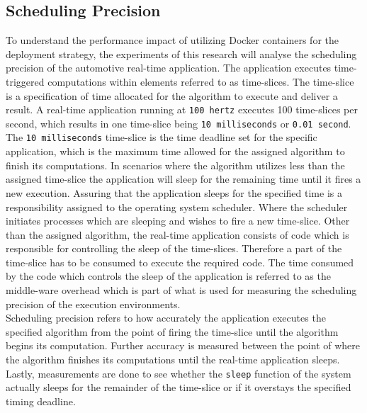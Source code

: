 \subsection{Scheduling Precision}
To understand the performance impact of utilizing Docker containers for the deployment strategy, the experiments of this research will analyse the scheduling precision of the automotive real-time application. The application executes time-triggered computations within elements referred to as time-slices. The time-slice is a specification of time allocated for the algorithm to execute and deliver a result. A real-time application running at \texttt{100 hertz} executes 100 time-slices per second, which results in one time-slice being \texttt{10 milliseconds} or \texttt{0.01 second}. The \texttt{10 milliseconds} time-slice is the time deadline set for the specific application, which is the maximum time allowed for the assigned algorithm to finish its computations. In scenarios where the algorithm utilizes less than the assigned time-slice the application will sleep for the remaining time until it fires a new execution. Assuring that the application sleeps for the specified time is a responsibility assigned to the operating system scheduler. Where the scheduler initiates processes which are sleeping and wishes to fire a new time-slice. Other than the assigned algorithm, the real-time application consists of code which is responsible for controlling the sleep of the time-slices. Therefore a part of the time-slice has to be consumed to execute the required code. The time consumed by the code which controls the sleep of the application is referred to as the middle-ware overhead which is part of what is used for measuring the scheduling precision of the execution environments.\\

Scheduling precision refers to how accurately the application executes the specified algorithm from the point of firing the time-slice until the algorithm begins its computation. Further accuracy is measured between the point of where the algorithm finishes its computations until the real-time application sleeps. Lastly, measurements are done to see whether the \texttt{sleep} function of the system actually sleeps for the remainder of the time-slice or if it overstays the specified timing deadline.\\


